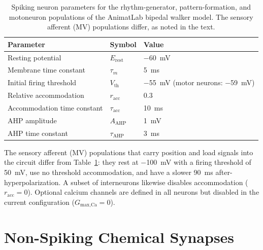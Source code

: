 \begin{table}[htbp]
\caption{Spiking neuron parameters for the rhythm-generator,
pattern-formation, and motoneuron populations of the AnimatLab bipedal walker
model. The sensory afferent (MV) populations differ, as noted in the text.}
\label{tab:app_neuron}
\begin{tabular}{@{}lll@{}}
\toprule
\textbf{Parameter} & \textbf{Symbol} & \textbf{Value} \\
\midrule
Resting potential        & $E_{\text{rest}}$   & \qty{-60}{\mV} \\
Membrane time constant   & $\tau_{m}$          & \qty{5}{\ms}   \\
Initial firing threshold & $V_{\text{th}}$     & \qty{-55}{\mV} (motor neurons: \qty{-59}{\mV}) \\
Relative accommodation   & $r_{\text{acc}}$    & 0.3            \\
Accommodation time constant & $\tau_{\text{acc}}$ & \qty{10}{\ms} \\
AHP amplitude            & $A_{\text{AHP}}$    & \qty{1}{\mV}   \\
AHP time constant        & $\tau_{\text{AHP}}$ & \qty{3}{\ms}   \\
\bottomrule
\end{tabular}
\end{table}

The sensory afferent (MV) populations that carry position and load signals into
the circuit differ from Table~\ref{tab:app_neuron}: they rest at
\qty{-100}{\mV} with a firing threshold of \qty{+50}{\mV}, use no threshold
accommodation, and have a slower \qty{90}{\ms} after-hyperpolarization. A
subset of interneurons likewise disables accommodation
($r_{\text{acc}} = 0$). Optional calcium channels are defined in all neurons
but disabled in the current configuration ($G_{\text{max,Ca}} = 0$).

\section{Non-Spiking Chemical Synapses}

